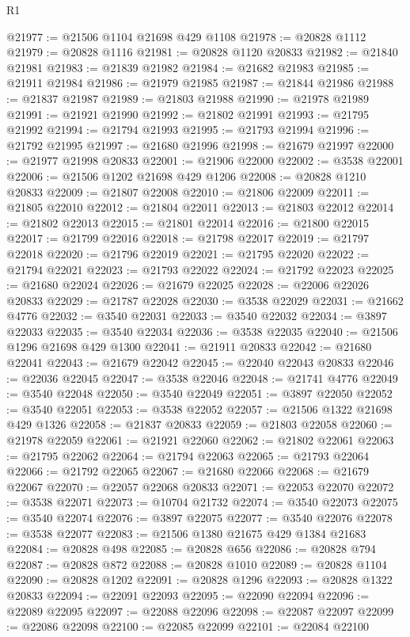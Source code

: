 \begin{lexlean}{R1}
\begin{coremodule}
@21977 := @21506 @1104 @21698 @429 @1108
@21978 := @20828 @1112
@21979 := @20828 @1116
@21981 := @20828 @1120 @20833
@21982 := @21840 @21981
@21983 := @21839 @21982
@21984 := @21682 @21983
@21985 := @21911 @21984
@21986 := @21979 @21985
@21987 := @21844 @21986
@21988 := @21837 @21987
@21989 := @21803 @21988
@21990 := @21978 @21989
@21991 := @21921 @21990
@21992 := @21802 @21991
@21993 := @21795 @21992
@21994 := @21794 @21993
@21995 := @21793 @21994
@21996 := @21792 @21995
@21997 := @21680 @21996
@21998 := @21679 @21997
@22000 := @21977 @21998 @20833
@22001 := @21906 @22000
@22002 := @3538 @22001
@22006 := @21506 @1202 @21698 @429 @1206
@22008 := @20828 @1210 @20833
@22009 := @21807 @22008
@22010 := @21806 @22009
@22011 := @21805 @22010
@22012 := @21804 @22011
@22013 := @21803 @22012
@22014 := @21802 @22013
@22015 := @21801 @22014
@22016 := @21800 @22015
@22017 := @21799 @22016
@22018 := @21798 @22017
@22019 := @21797 @22018
@22020 := @21796 @22019
@22021 := @21795 @22020
@22022 := @21794 @22021
@22023 := @21793 @22022
@22024 := @21792 @22023
@22025 := @21680 @22024
@22026 := @21679 @22025
@22028 := @22006 @22026 @20833
@22029 := @21787 @22028
@22030 := @3538 @22029
@22031 := @21662 @4776
@22032 := @3540 @22031
@22033 := @3540 @22032
@22034 := @3897 @22033
@22035 := @3540 @22034
@22036 := @3538 @22035
@22040 := @21506 @1296 @21698 @429 @1300
@22041 := @21911 @20833
@22042 := @21680 @22041
@22043 := @21679 @22042
@22045 := @22040 @22043 @20833
@22046 := @22036 @22045
@22047 := @3538 @22046
@22048 := @21741 @4776
@22049 := @3540 @22048
@22050 := @3540 @22049
@22051 := @3897 @22050
@22052 := @3540 @22051
@22053 := @3538 @22052
@22057 := @21506 @1322 @21698 @429 @1326
@22058 := @21837 @20833
@22059 := @21803 @22058
@22060 := @21978 @22059
@22061 := @21921 @22060
@22062 := @21802 @22061
@22063 := @21795 @22062
@22064 := @21794 @22063
@22065 := @21793 @22064
@22066 := @21792 @22065
@22067 := @21680 @22066
@22068 := @21679 @22067
@22070 := @22057 @22068 @20833
@22071 := @22053 @22070
@22072 := @3538 @22071
@22073 := @10704 @21732
@22074 := @3540 @22073
@22075 := @3540 @22074
@22076 := @3897 @22075
@22077 := @3540 @22076
@22078 := @3538 @22077
@22083 := @21506 @1380 @21675 @429 @1384 @21683
@22084 := @20828 @498
@22085 := @20828 @656
@22086 := @20828 @794
@22087 := @20828 @872
@22088 := @20828 @1010
@22089 := @20828 @1104
@22090 := @20828 @1202
@22091 := @20828 @1296
@22093 := @20828 @1322 @20833
@22094 := @22091 @22093
@22095 := @22090 @22094
@22096 := @22089 @22095
@22097 := @22088 @22096
@22098 := @22087 @22097
@22099 := @22086 @22098
@22100 := @22085 @22099
@22101 := @22084 @22100

\end{coremodule}
\end{lexlean}
